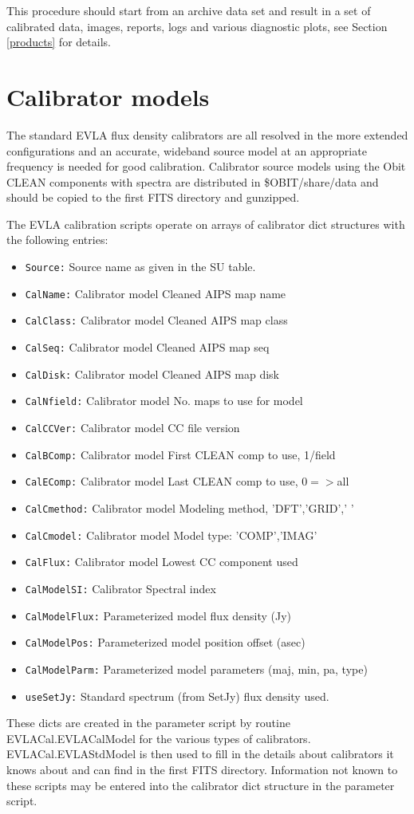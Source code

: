 \documentclass[11pt]{article}
\begin{document}
This procedure should start from an archive data set and result in a
set of calibrated data, images, reports, logs and various diagnostic
plots, see Section \ref{products} for details.
\section{Calibrator models}\label{calmodel}
The standard EVLA flux density calibrators are all resolved in the
more extended configurations and an accurate, wideband source model at
an appropriate frequency is needed for good calibration.
Calibrator source models using the Obit CLEAN components with spectra
are distributed in \$OBIT/share/data and should be copied to the first
FITS directory and gunzipped.

The EVLA calibration scripts operate on arrays of calibrator dict
structures with the following entries:
\begin{itemize}
\item{\tt  Source:}       Source name as given in the SU table. 
\item{\tt  CalName:}      Calibrator model Cleaned AIPS  map name 
\item{\tt  CalClass:}     Calibrator model Cleaned AIPS  map class
\item{\tt  CalSeq:}       Calibrator model Cleaned AIPS  map seq
\item{\tt  CalDisk:}      Calibrator model Cleaned AIPS  map disk
\item{\tt  CalNfield:}    Calibrator model No. maps to use for model
\item{\tt  CalCCVer:}     Calibrator model CC file version
\item{\tt  CalBComp:}     Calibrator model First CLEAN comp to use, 1/field
\item{\tt  CalEComp:}     Calibrator model Last CLEAN comp to use, 0$=>$all
\item{\tt  CalCmethod:}   Calibrator model Modeling method, 'DFT','GRID','    '
\item{\tt  CalCmodel:}    Calibrator model Model type: 'COMP','IMAG'
\item{\tt  CalFlux:}      Calibrator model Lowest CC component used
\item{\tt  CalModelSI:}   Calibrator Spectral index
\item{\tt  CalModelFlux:} Parameterized model flux density (Jy)
\item{\tt  CalModelPos:}  Parameterized model position offset (asec)
\item{\tt  CalModelParm:} Parameterized model parameters (maj, min, pa, type)
\item{\tt  useSetJy:}     Standard spectrum (from SetJy) flux density used.
\end{itemize}
These dicts are created in the parameter script by routine
EVLACal.EVLACalModel for the various types of calibrators.
EVLACal.EVLAStdModel is then used to fill in the details about
calibrators it knows about and can find in the first FITS directory.
Information not known to these scripts may be entered into the
calibrator dict structure in the parameter script.
\end{document}
